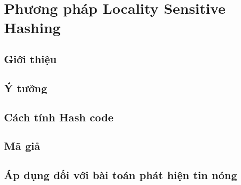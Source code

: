 \chapter{Phương pháp Locality Sensitive Hashing}
\ifpdf
    \graphicspath{{Chapter3/Chapter3Figs/PNG/}{Chapter3/Chapter3Figs/PDF/}{Chapter3/Chapter3Figs/}}
\else
    \graphicspath{{Chapter3/Chapter3Figs/EPS/}{Chapter3/Chapter3Figs/}}
\fi

\section{Giới thiệu}

\section{Ý tưởng}

\section{Cách tính Hash code}

\section{Mã giả}

\section{Áp dụng đối với bài toán phát hiện tin nóng}